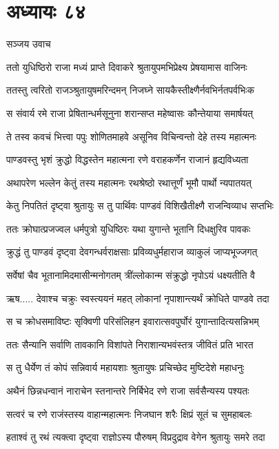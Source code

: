 \chapter{अध्यायः ८४}
\twolineshloka
{सञ्जय उवाच}
{}


\twolineshloka
{ततो युधिष्ठिरो राजा मध्यं प्राप्ते दिवाकरे}
{श्रुतायुपमभिप्रेक्ष्य प्रेषयामास वाजिनः}


\twolineshloka
{ततस्तु त्वरितो राजञ्श्रुतायुषमरिन्दमन्}
{निजघ्ने सायकैस्तीक्ष्णैर्नवभिर्नतपर्वभिःक}


\twolineshloka
{स संवार्य रमे राजा प्रेषितान्धर्मसूनुना}
{शरान्सप्त महेष्वासः कौन्तेयाया समार्षयत्}


\twolineshloka
{ते तस्व कवचं भित्त्वा पपुः शोणितमाहवे}
{असूनिव विचिन्वन्तो देहे तस्य महात्मनः}


\twolineshloka
{पाण्डवस्तु भृशं क्रुद्धो विद्धस्तेन महात्मना}
{रणे वराहकर्णेन राजानं हृद्यविध्यता}


\twolineshloka
{अथापरेण भल्लेन केतुं तस्य महात्मनः}
{रथश्रेष्ठो रथात्तूर्णं भूमौ पार्थो न्यपातयत्}


\twolineshloka
{केतु निपतितं दृष्ट्वा श्रुतायुः स तु पार्थिवः}
{पाण्डवं विशिखैतीक्ष्णै राजन्विव्याध सप्तभिः}


\twolineshloka
{ततः क्रोघात्प्रजज्वल धर्मपुत्रो युधिष्ठिरः}
{यथा युगान्ते भूतानि दिधक्षुरिव पावकः}


\twolineshloka
{क्रुद्धं तु पाण्डवं दृष्ट्वा देवगन्धर्वराक्षसाः}
{प्रविव्यधुर्महाराज व्याकुलं जाप्यभूज्जगत्}


\twolineshloka
{सर्वेषां चैव भूतानामिदमासीन्मनोगतम्}
{त्रींल्लोकान्म संक्रुद्धो नृपोऽयं धक्ष्यतीति वै}


\twolineshloka
{ऋष..... देवाश्च चक्रुः स्वस्त्ययनं महत्}
{लोकानां नृपाशान्त्यर्थं क्रोधिते पाण्डवे तदा}


\twolineshloka
{स च क्रोधसमाविष्टः सृक्विणी परिसंलिहन}
{इवारात्सवपुर्घोरं युगान्तादित्यसन्निभम्}


\twolineshloka
{ततः सैन्यानि सर्वाणि तावकानि विशांपते}
{निराशान्यभवंस्तत्र जीवितं प्रति भारत}


\twolineshloka
{स तु धैर्येण तं कोपं सन्निवार्य महायशाः}
{श्रुतायुषः प्रचिच्छेद मुष्टिदेशे महाधनुः}


\twolineshloka
{अथैनं छिन्नधन्वानं नाराचेन स्तनान्तरे}
{निर्बिभेद रणे राजा सर्वसैन्यस्य पश्यतः}


\twolineshloka
{सत्वरं च रणे राजंस्तस्य वाहान्महात्मनः}
{निजघान शरैः क्षिप्रं सूतं च सुमहाबलः}


\twolineshloka
{हताश्वं तु रथं त्यक्त्वा दृष्ट्वा राज्ञोऽस्य पौरुषम्}
{विप्रदुद्राव वेगेन श्रुतायुः समरे तदा}


